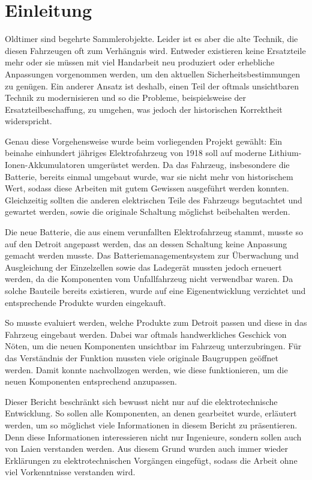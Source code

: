 \chapter{Einleitung}

Oldtimer sind begehrte Sammlerobjekte. Leider ist es aber die alte Technik, die diesen Fahrzeugen oft zum Verhängnis wird. Entweder existieren keine Ersatzteile mehr oder sie müssen mit viel Handarbeit neu produziert oder erhebliche Anpassungen vorgenommen werden, um den aktuellen Sicherheitsbestimmungen zu genügen. Ein anderer Ansatz ist deshalb, einen Teil der oftmals unsichtbaren Technik zu modernisieren und so die Probleme, beispielsweise der Ersatzteilbeschaffung, zu umgehen, was jedoch der historischen Korrektheit widerspricht.

Genau diese Vorgehensweise wurde beim vorliegenden Projekt gewählt: Ein beinahe einhundert jähriges Elektrofahrzeug von 1918 soll auf moderne Lithium-Ionen-Akkumulatoren umgerüstet werden. Da das Fahrzeug, insbesondere die Batterie, bereits einmal umgebaut wurde, war sie nicht mehr von historischem Wert, sodass diese Arbeiten mit gutem Gewissen ausgeführt werden konnten. Gleichzeitig sollten die anderen elektrischen Teile des Fahrzeugs begutachtet und gewartet werden, sowie die originale Schaltung möglichst beibehalten werden.

Die neue Batterie, die aus einem verunfallten Elektrofahrzeug stammt, musste so auf den Detroit angepasst werden, das an dessen Schaltung keine Anpassung gemacht werden musste. Das Batteriemanagementsystem zur Überwachung und Ausgleichung der Einzelzellen sowie das Ladegerät mussten jedoch erneuert werden, da die Komponenten vom Unfallfahrzeug nicht verwendbar waren. Da solche Bauteile bereits existieren, wurde auf eine Eigenentwicklung verzichtet und entsprechende Produkte wurden eingekauft.

So musste evaluiert werden, welche Produkte zum Detroit passen und diese in das Fahrzeug eingebaut werden. Dabei war oftmals handwerkliches Geschick von Nöten, um die neuen Komponenten unsichtbar im Fahrzeug unterzubringen. Für das Verständnis der Funktion mussten viele originale Baugruppen geöffnet werden. Damit konnte nachvollzogen werden, wie diese funktionieren, um die neuen Komponenten entsprechend anzupassen.

Dieser Bericht beschränkt sich bewusst nicht nur auf die elektrotechnische Entwicklung. So sollen alle Komponenten, an denen gearbeitet wurde, erläutert werden, um so möglichst viele Informationen in diesem Bericht zu präsentieren. Denn diese Informationen interessieren nicht nur Ingenieure, sondern sollen auch von Laien verstanden werden. Aus diesem Grund wurden auch immer wieder Erklärungen zu elektrotechnischen Vorgängen eingefügt, sodass die Arbeit ohne viel Vorkenntnisse verstanden wird.
